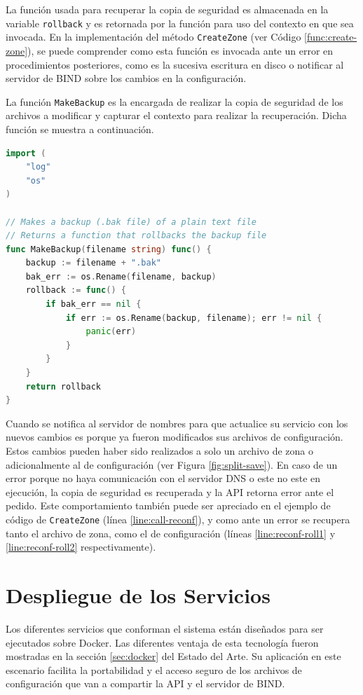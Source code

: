 La función usada para recuperar la copia de seguridad es almacenada en la variable \verb|rollback| y es retornada por la función para uso del contexto en que sea invocada. En la implementación del método \verb|CreateZone| (ver Código \ref{func:create-zone}), se puede comprender como esta función es invocada ante un error en procedimientos posteriores, como es la sucesiva escritura en disco o notificar al servidor de BIND sobre los cambios en la configuración.

La función \verb|MakeBackup| es la encargada de realizar la copia de seguridad de los archivos a modificar y capturar el contexto para realizar la recuperación. Dicha función se muestra a continuación.

\begin{lstlisting}[frame=single, language=Go, caption=Función encargada de mantener una copia de seguridad al modificar los archivos de BIND.]
import (
    "log"
    "os"
)

// Makes a backup (.bak file) of a plain text file
// Returns a function that rollbacks the backup file
func MakeBackup(filename string) func() {
    backup := filename + ".bak"
    bak_err := os.Rename(filename, backup)
    rollback := func() {
        if bak_err == nil {
            if err := os.Rename(backup, filename); err != nil {
                panic(err)
            }
        }
    }
    return rollback
}
\end{lstlisting}

Cuando se notifica al servidor de nombres para que actualice su servicio con los nuevos cambios es porque ya fueron modificados sus archivos de configuración. Estos cambios pueden haber sido realizados a solo un archivo de zona o adicionalmente al de configuración (ver Figura \ref{fig:split-save}). En caso de un error porque no haya comunicación con el servidor DNS o este no este en ejecución, la copia de seguridad es recuperada y la API retorna error ante el pedido. Este comportamiento también puede ser apreciado en el ejemplo de código de \verb|CreateZone| (línea \ref{line:call-reconf}), y como ante un error se recupera tanto el archivo de zona, como el de configuración (líneas \ref{line:reconf-roll1} y \ref{line:reconf-roll2} respectivamente).

\section{Despliegue de los Servicios}

Los diferentes servicios que conforman el sistema están diseñados para ser ejecutados sobre Docker. Las diferentes ventaja de esta tecnología fueron mostradas en la sección \ref{sec:docker} del Estado del Arte. Su aplicación en este escenario facilita la portabilidad y el acceso seguro de los archivos de configuración que van a compartir la API y el servidor de BIND.

